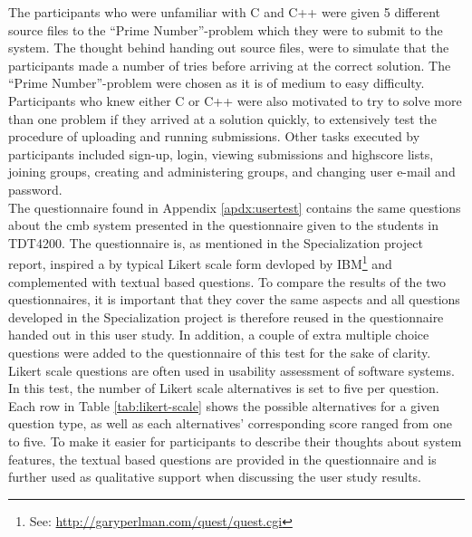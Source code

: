 The participants who were unfamiliar with C and C++ were given 5 different source files to the ``Prime Number''-problem which they were to submit to the system. The thought behind handing out source files, were to simulate that the participants made a number of tries before arriving at the correct solution. The ``Prime Number''-problem were chosen as it is of medium to easy difficulty. Participants who knew either C or C++ were also motivated to try to solve more than one problem if they arrived at a solution quickly, to extensively test the procedure of uploading and running submissions. Other tasks executed by participants included sign-up, login, viewing submissions and highscore lists, joining groups, creating and administering groups, and changing user e-mail and password. \\

The questionnaire found in Appendix \ref{apdx:usertest} contains the same questions about the \gls{cmb} system presented in the questionnaire given to the students in TDT4200. The questionnaire is, as mentioned in the Specialization project report, inspired a by typical Likert scale form devloped by IBM\footnote{See: \url{http://garyperlman.com/quest/quest.cgi}} and complemented with textual based questions. To compare the results of the two questionnaires, it is important that they cover the same aspects and all questions developed in the Specialization project is therefore reused in the questionnaire handed out in this user study. In addition, a couple of extra multiple choice questions were added to the questionnaire of this test for the sake of clarity. \\

Likert scale questions are often used in usability assessment of software systems. In this test, the number of Likert scale alternatives is set to five per question. Each row in Table \ref{tab:likert-scale} shows the possible alternatives for a given question type, as well as each alternatives' corresponding score ranged from one to five. To make it easier for participants to describe their thoughts about system features, the textual based questions are provided in the questionnaire and is further used as qualitative support when discussing the user study results. \\

